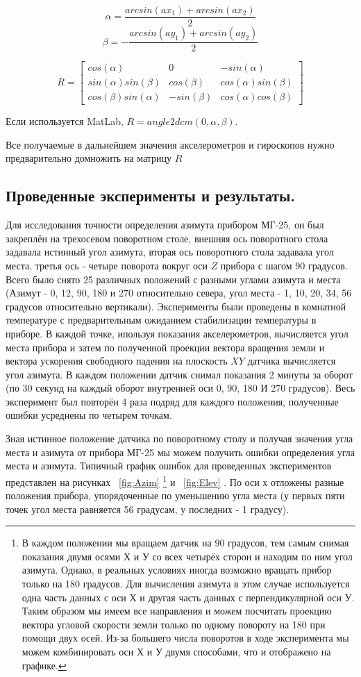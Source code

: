 \documentclass[a4paper,12pt]{article}
\begin{document}
\[ \alpha = \frac{arcsin(ax_1)+arcsin(ax_2)}{2}\]
\[ \beta = - \frac{arcsin(ay_1)+arcsin(ay_2)}{2}\]

\[
R = 
\begin{bmatrix}
cos(\alpha) & 0 & -sin(\alpha)\\
sin(\alpha)sin(\beta) & cos(\beta) & cos(\alpha)sin(\beta) \\
cos(\beta)sin(\alpha) & -sin(\beta) & cos(\alpha)cos(\beta)
\end{bmatrix}
\]

Если используется MatLab, $R = angle2dcm(0, \alpha, \beta)$.

Все получаемые в дальнейшем значения акселерометров и гироскопов нужно предварительно домножить на матрицу $R$

\subsection{Проведенные эксперименты и результаты.}

Для исследования точности определения азимута прибором МГ-25, он был закреплён на трехосевом поворотном столе, внешняя ось поворотного стола задавала истинный угол азимута, вторая ось поворотного стола задавала угол места, третья ось - четыре поворота вокруг оси $Z$ прибора с шагом 90 градусов. Всего было снято 25 различных положений с разными углами азимута и места (Азимут - 0, 12, 90, 180 и 270 относительно севера, угол места - 1, 10, 20, 34, 56 градусов относительно вертикали). Эксперименты были проведены в комнатной температуре с предварительным ожиданием стабилизации температуры в приборе. В каждой точке, ипользуя показания акселерометров, вычисляется угол места прибора и затем по полученной проекции вектора вращения земли и вектора ускорения свободного падения на плоскость $XY$ датчика вычисляется угол азимута. В каждом положении датчик снимал показания 2 минуты за оборот (по 30 секунд на каждый оборот внутренней оси 0, 90, 180 И 270 градусов). Весь эксперимент был повторён 4 раза подряд для каждого положения, полученные ошибки усреднены по четырем точкам.

Зная истинное положение датчика по поворотному столу и получая значения угла места и азимута от прибора МГ-25 мы можем получить ошибки определения угла места и азимута. Типичный график ошибок для проведенных экспериментов представлен на рисунках ~\ref{fig:Azim} \footnote{В каждом положении мы вращаем датчик на 90 градусов, тем самым снимая показания двумя осями Х и У со всех четырёх сторон и находим по ним угол азимута. Однако, в реальных условиях иногда возможно вращать прибор только на 180 градусов. Для вычисления азимута в этом случае используется одна часть данных с оси Х и другая часть данных с перпендикулярной оси У. Таким образом мы имеем все направления и можем посчитать проекцию вектора угловой скорости земли только по одному повороту на 180 при помощи двух осей. Из-за большего числа поворотов в ходе эксперимента мы можем комбинировать оси Х и У двумя способами, что и отображено на графике. } и ~\ref{fig:Elev} . По оси х отложены разные положения прибора, упорядоченные по уменьшению угла места (у первых пяти точек угол места равняется 56 градусам, у последних - 1 градусу).
\end{document}
